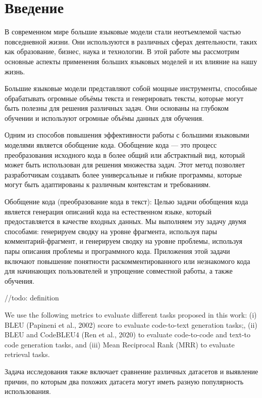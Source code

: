 \documentclass[14pt]{article}
\theoremstyle{definition}
\begin{document}
\pagebreake[2]


\newpage
\tableofcontents
\newpage
\section{Введение}
В современном мире большие языковые модели стали неотъемлемой частью повседневной жизни. Они используются в различных сферах деятельности, таких как образование, бизнес, наука и технологии. В этой работе мы рассмотрим основные аспекты применения больших языковых моделей и их влияние на нашу жизнь.

Большие языковые модели представляют собой мощные инструменты, способные обрабатывать огромные объёмы текста и генерировать тексты, которые могут быть полезны для решения различных задач. Они основаны на глубоком обучении и используют огромные объёмы данных для обучения.

Одним из способов повышения эффективности работы с большими языковыми моделями является обобщение кода. Обобщение кода — это процесс преобразования исходного кода в более общий или абстрактный вид, который может быть использован для решения множества задач. Этот метод позволяет разработчикам создавать более универсальные и гибкие программы, которые могут быть адаптированы к различным контекстам и требованиям.

Обобщение кода (преобразование кода в текст): Целью задачи обобщения кода является генерация
описаний кода на естественном языке, который предоставляется в качестве входных данных. Мы выполняем эту задачу
двумя способами: генерируем сводку на уровне фрагмента, используя пары комментарий-фрагмент, и генерируем
сводку на уровне проблемы, используя пары описания проблемы и программного кода. Приложения
этой задачи включают повышение понятности раскомментированного или незнакомого кода для начинающих
пользователей и упрощение совместной работы, а также обучения.


//todo: definition 

We use the following metrics to evaluate different tasks proposed in this work: (i) BLEU (Papineni
et al., 2002) score to evaluate code-to-text generation tasks;, (ii) BLEU and CodeBLEU4 (Ren et al.,
2020) to evaluate code-to-code and text-to code generation tasks, and (iii) Mean Reciprocal Rank
(MRR) to evaluate retrieval tasks.

Задача исследования также включает сравнение различных датасетов и выявление причин, по которым два похожих датасета могут иметь разную популярность использования.
\end{document}
